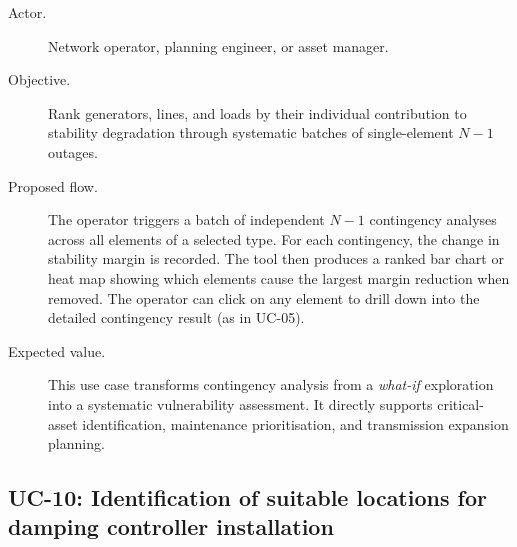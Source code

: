 \begin{description}
  \item[Actor.] Network operator, planning engineer, or asset manager.
  \item[Objective.] Rank generators, lines, and loads by their individual contribution to stability degradation through systematic batches of single-element $N-1$ outages.
  \item[Proposed flow.] The operator triggers a batch of independent $N-1$ contingency analyses across all elements of a selected type. For each contingency, the change in stability margin is recorded. The tool then produces a ranked bar chart or heat map showing which elements cause the largest margin reduction when removed. The operator can click on any element to drill down into the detailed contingency result (as in UC-05).
  \item[Expected value.] This use case transforms contingency analysis from a \textit{what-if} exploration into a systematic vulnerability assessment. It directly supports critical-asset identification, maintenance prioritisation, and transmission expansion planning.
\end{description}

\subsection{UC-10: Identification of suitable locations for damping controller installation}

